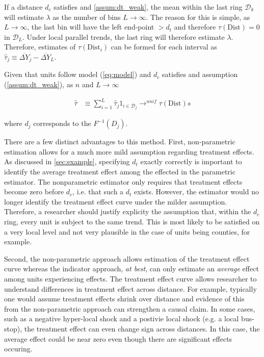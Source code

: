 \documentclass[10pt]{article}
\newcommand{\dist}{\text{Dist}}
\begin{document}
If a distance $d_c$ satisfies  and \ref{assum:dt_weak}, the mean within the last ring $\mathcal{D}_k$ will estimate $\lambda$ as the number of bins $L \to \infty$. The reason for this is simple, as $L \to \infty$, the last bin will have the left end-point $> d_t$ and therefore $\tau(\dist) = 0$ in $\mathcal{D}_L$. Under local parallel trends, the last ring will therefore estimate $\lambda$. Therefore, estimates of $\tau(\dist_i)$ can be formed for each interval as $\hat{\tau}_j \equiv \overline{\Delta Y}_j - \overline{\Delta Y}_L$. 

\begin{proposition}\label{prop:np_identification}  
    Given that units follow model (\ref{eq:model}) and $d_c$ satisfies  and assumption (\ref{assum:dt_weak}), as $n$ and $L \to \infty$ 

    \begin{align*}
        \hat{\tau} &\equiv \sum_{i=1}^L \hat{\tau}_j 1_{i \in \mathcal{D}_j} \to^{unif} \tau(\dist)s
    \end{align*}

    where $d_j$ corresponds to the $F^{-1}(D_j)$.
\end{proposition}

There are a few distinct advantages to this method. First, non-parametric estimation allows for a much more mild assumption regarding treatment effects. As discussed in \autoref{sec:example}, specifying $d_t$ exactly correctly is important to identify the average treatment effect among the effected in the parametric estimator. The nonparametric estimator only requires that treatment effects become zero before $d_c$, i.e. that such a $d_t$ exists. However, the estimator would no longer identify the treatment effect curve under the milder  assumption. Therefore, a researcher should justify explicity the assumption that, within the $d_c$ ring, every unit is subject to the same trend. This is most likely to be satisfied on a very local level and not very plausible in the case of units being counties, for example.

Second, the non-parametric approach allows estimation of the treatment effect curve whereas the indicator approach, \emph{at best}, can only estimate an \emph{average} effect among units experiencing effects. The treatment effect curve allows researcher to understand differences in treatment effect across distance. For example, typically one would assume treatment effects shrink over distance and evidence of this from the non-parametric approach can strengthen a causal claim. In some cases, such as a negative hyper-local shock and a postivie local shock (e.g. a local bus-stop), the treatment effect can even change sign across distances. In this case, the average effect could be near zero even though there are significant effects occuring. 
\end{document}
